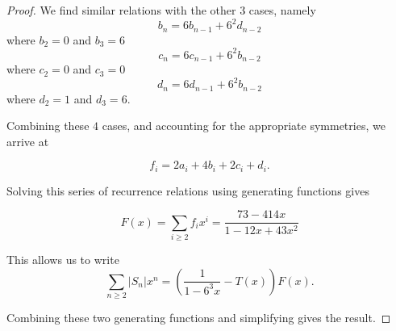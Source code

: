 \documentclass[12pt]{article}
\theoremstyle{plain}
\theoremstyle{definition}
\theoremstyle{remark}
\theoremstyle{definition}
\begin{document}
\begin{proof}
We find similar relations with the other $3$ cases, namely
$$b_n = 6b_{n-1} + 6^2 d_{n-2}$$
where $b_2 = 0$ and $b_3 = 6$
$$c_n = 6c_{n-1} + 6^2 b_{n-2}$$
where $c_2 = 0$ and $c_3 = 0$
$$d_n = 6d_{n-1} + 6^2 b_{n-2}$$
where $d_2 = 1$ and $d_3 = 6.$

Combining these $4$ cases, and accounting for the appropriate symmetries, we arrive at

$$f_i = 2a_i + 4b_i + 2c_i + d_i.$$

Solving this series of recurrence relations using generating functions gives

$$F(x) = \sum_{i \geq 2} f_i x^i = \frac{73 - 414x}{1-12x+43x^2}$$

This allows us to write 
$$\sum_{n \geq 2} |S_n|x^n = \left(\frac{1}{1-6^3x}-T(x)\right)F(x).$$

Combining these two generating functions and simplifying gives the result.

\end{proof}
\end{document}

